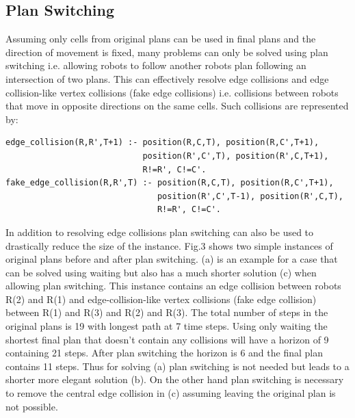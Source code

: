 \documentclass{llncs}
\begin{document}
\subsection{Plan Switching}
Assuming only cells from original plans can be used in final plans and the direction of movement is fixed, many problems can only be solved using plan switching i.e. allowing robots to follow another robots plan following an intersection of two plans. 
This can effectively resolve edge collisions and edge collision-like vertex collisions (fake edge collisions) i.e. collisions between robots that move in opposite directions on the same cells.
Such collisions are represented by:
\begin{verbatim}
edge_collision(R,R',T+1) :- position(R,C,T), position(R,C',T+1),
                            position(R',C',T), position(R',C,T+1),
                            R!=R', C!=C'.
fake_edge_collision(R,R',T) :- position(R,C,T), position(R,C',T+1),
                               position(R',C',T-1), position(R',C,T),
                               R!=R', C!=C'.
\end{verbatim}
In addition to resolving edge collisions plan switching can also be used to drastically reduce the size of the instance.
Fig.3 shows two simple instances of original plans before and after plan switching. (a) is an example for a case that can be solved using waiting but also has a much shorter solution (c) when allowing plan switching. This instance contains an edge collision between robots R(2) and R(1) and edge-collision-like vertex collisions (fake edge collision) between R(1) and R(3) and R(2) and R(3).
The total number of steps in the original plans is 19 with longest path at 7 time steps. Using only waiting the shortest final plan that doesn't contain any collisions will have a horizon of 9 containing 21 steps. After plan switching the horizon is 6 and the final plan contains 11 steps. Thus for solving (a) plan switching is not needed but leads to a shorter more elegant solution (b).
On the other hand plan switching is necessary to remove the central edge collision in (c) assuming leaving the original plan is not possible.\\
\end{document}
